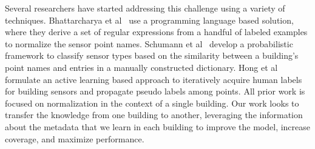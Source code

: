 Several researchers have started addressing this challenge using a variety of techniques.
Bhattarcharya et al~\cite{arka} use a programming language based solution, 
where they derive a set of regular expressions from a handful of labeled examples 
to normalize the sensor point names. 
Schumann et al~\cite{ibm} develop a probabilistic framework to classify sensor types 
based on the similarity between a building's point names and entries in a manually constructed dictionary. 
Hong et al~\cite{cikm} formulate an active learning based approach to iteratively 
acquire human labels for building sensors and propagate pseudo labels among points.
All prior work is focused on normalization in the context of a single building.  Our work looks to 
transfer the knowledge from one building to another, leveraging the information about the metadata that
we learn in each building to improve the model, increase coverage, and maximize performance.




